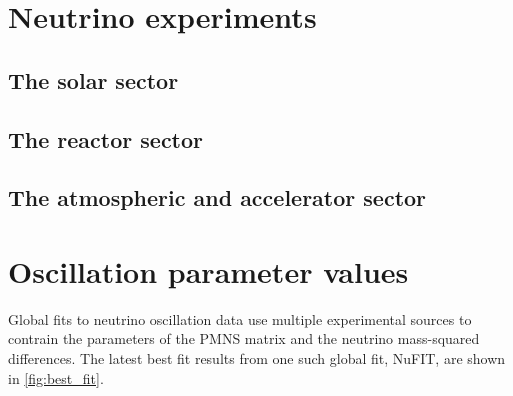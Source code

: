 \section{Neutrino experiments} %
\label{sec:theory_exp} %

\subsection{The solar sector} %
\label{sec:theory_exp_solar} %

\subsection{The reactor sector} %
\label{sec:theory_exp_reactor} %

\subsection{The atmospheric and accelerator sector} %
\label{sec:theory_exp_atmospheric} %

\section{Oscillation parameter values} %
\label{sec:theory_summary} %

Global fits to neutrino oscillation data use multiple experimental sources to contrain the
parameters of the PMNS matrix and the neutrino mass-squared differences. The latest best fit
results from one such global fit, NuFIT, are shown in \ref{fig:best_fit}.

